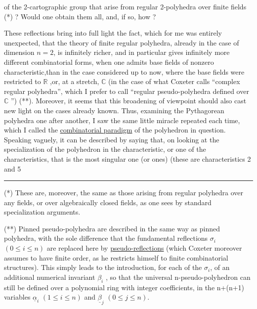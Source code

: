 
of the 2-cartographic group that arise from regular 2-polyhedra
over finite fields (*) ? Would one obtain them all,
and, if so, how ?

These reflections bring into full light the fact,
which for me was entirely unexpected, that the theory of
finite regular polyhedra, already in the case of dimension
$n = 2$, is infinitely richer, and in particular gives infinitely
more different combinatorial forms, when one admits
base fields of nonzero characteristic,\quad than in the
case considered up to now, where the base fields were restricted
to $\mathbb{R}$ ,or, at a stretch, $\mathbb{C}$ (in the case of what Coxeter
calls ``complex regular polyhedra'', which I prefer
to call ``regular pseudo-polyhedra defined over $\mathbb{C}$ '') (**). Moreover,
it seems that this broadening of viewpoint should also cast
new light on the cases already known. Thus, examining the
Pythagorean polyhedra one after another, I saw
the same little miracle repeated each time, which I called the \uline{combinatorial
paradigm} of the polyhedron in question. Speaking vaguely, it can be
described by saying that, on looking at the specialization of the polyhedron
in the characteristic, or one of the characteristics, that is
the most singular one (or ones) (these are characteristics 2 and 5

\rule{5cm}{0.4pt}

(*) These are, moreover, the same as those arising from regular
polyhedra over any fields, or over algebraically closed fields, as
one sees by standard specialization arguments.

(**) Pinned pseudo-polyhedra are described in the same way as
pinned polyhedra, with the sole difference that the fundamental
reflections $\sigma_i$ $(0 \leq i \leq n)$ are replaced here by \uline{pseudo-reflections}
(which Coxeter moreover assumes to have finite order, as he
restricts himself to finite combinatorial structures). This simply leads
to the introduction, for each of the $\sigma_i$, of an additional numerical
invariant $\beta_i$ , so that the universal n-pseudo-polyhedron can still be
defined over a polynomial ring with integer coefficients, in
the n+(n+1) variables $\underline{\alpha}_i$ $(1 \leq i \leq n)$ and $\underline{\beta}_j$ $(0 \leq j \leq n)$.


